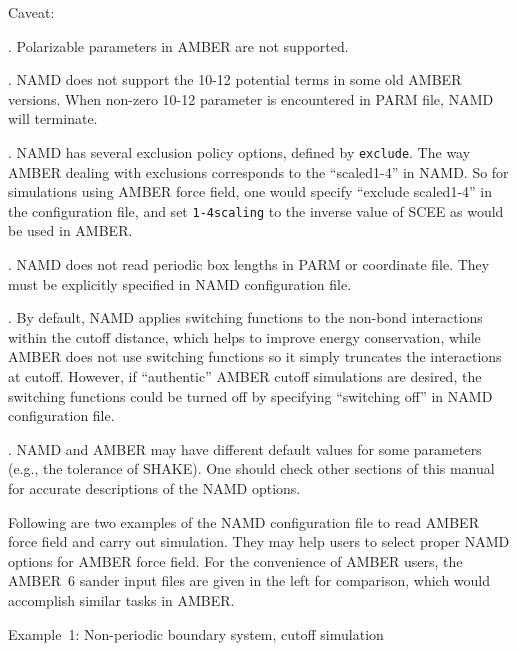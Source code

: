 \noindent Caveat:

. Polarizable parameters in AMBER are not supported.

. NAMD does not support the 10-12 potential terms in
some old AMBER versions. When non-zero 10-12 parameter is
encountered in PARM file, NAMD will terminate.

. NAMD has several exclusion policy options, defined
by {\tt exclude}. The way AMBER dealing with exclusions
corresponds to the ``scaled1-4'' in NAMD. So for simulations using
AMBER force field, one would specify ``exclude scaled1-4'' in the
configuration file, and set {\tt 1-4scaling} to the inverse value
of SCEE as would be used in AMBER.

. NAMD does not read periodic box lengths in PARM or
coordinate file. They must be explicitly specified in NAMD
configuration file.

. By default, NAMD applies switching functions to
the non-bond interactions within the cutoff distance,
which helps to improve energy conservation, while AMBER does not
use switching functions so it simply
truncates the interactions at cutoff. However, if ``authentic''
AMBER cutoff simulations are desired, the switching functions
could be turned off by specifying ``switching off'' in NAMD
configuration file.

. NAMD and AMBER may have different default values for
some parameters (e.g., the tolerance of SHAKE). One should check
other sections of this manual for accurate descriptions
of the NAMD options.
\newline

Following are two examples of the NAMD configuration file to read
AMBER force field and carry out simulation. They may help users
to select proper NAMD options for AMBER force field. For the
convenience of AMBER users, the AMBER~6 sander input files are
given in the left for comparison, which would accomplish similar
tasks in AMBER.
\newline

\noindent Example~1: Non-periodic boundary system, cutoff simulation

